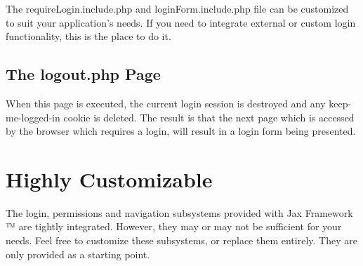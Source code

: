 \documentclass[letterpaper,10pt,english]{sphinxmanual}
\begin{document}
The requireLogin.include.php and loginForm.include.php file can be customized to suit your
application's needs.  If you need to integrate external or custom login functionality, this is the
place to do it.


\subsection{The logout.php Page}
\label{jaxFrameworkGuide:the-logout-php-page}
When this page is executed, the current login session is destroyed and any keep-me-logged-in cookie
is deleted.  The result is that the next page which is accessed by the browser which requires a
login, will result in a login form being presented.


\section{Highly Customizable}
\label{jaxFrameworkGuide:highly-customizable}
The login, permissions and navigation subsystems provided with Jax Framework ™ are tightly
integrated.  However, they may or may not be sufficient for your needs.  Feel free to customize
these subsystems, or replace them entirely.  They are only provided as a starting point.



\renewcommand{\indexname}{Index}
\printindex
\end{document}
